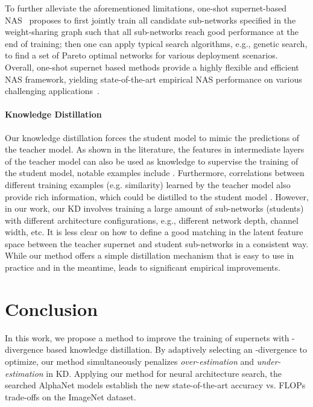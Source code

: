 \documentclass{article}
\begin{document}
To further alleviate the aforementioned limitations, 
one-shot supernet-based NAS~\citep[e.g.,][]{cai2019once, yu2020bignas, wang2020attentivenas} proposes to first jointly train 
all candidate sub-networks specified in the weight-sharing graph such that all sub-networks reach good performance at the end of training; 
 then one can apply typical search algorithms, e.g., genetic search, to find a set of Pareto optimal networks for various deployment scenarios. Overall, one-shot supernet based methods provide a highly flexible and efficient NAS framework, yielding state-of-the-art empirical NAS performance on various challenging applications~\citep[e.g.,][]{cai2019once, wang2020hat}.
\paragraph{Knowledge Distillation} 
Our knowledge distillation forces the student model to mimic the predictions of the teacher model.
As shown in the literature, the features in intermediate layers of the teacher model can also be used as knowledge to supervise the training of the student model, 
notable examples include \citep[e.g.,]{romero2014fitnets,  huang2017like, ahn2019variational, jang2019learning, passalis2018learning, li2019hint}. 
Furthermore, correlations between different training examples (e.g. similarity) learned by the teacher model also provide rich information, which could be distilled to the student model \citep{park2019relational, yim2017gift}.
However, in our work, our KD involves training a large amount of sub-networks (students) with different architecture configurations, e.g., different network depth, channel width, etc. 
It is less clear on how to define a good matching in the latent feature space between the teacher supernet and student sub-networks in a consistent way. 
While our method offers a simple distillation mechanism that is easy to use in practice and in the meantime, leads to significant empirical improvements. 

\section{Conclusion}
In this work, we propose a method to improve the training of supernets with -divergence based knowledge distillation. 
By adaptively selecting an -divergence to optimize, 
our method simultaneously penalizes \emph{over-estimation} and \emph{under-estimation} in KD. 
Applying our method for neural architecture search, the searched AlphaNet models establish the new state-of-the-art accuracy vs. FLOPs trade-offs on the ImageNet dataset.
 
\end{document}

